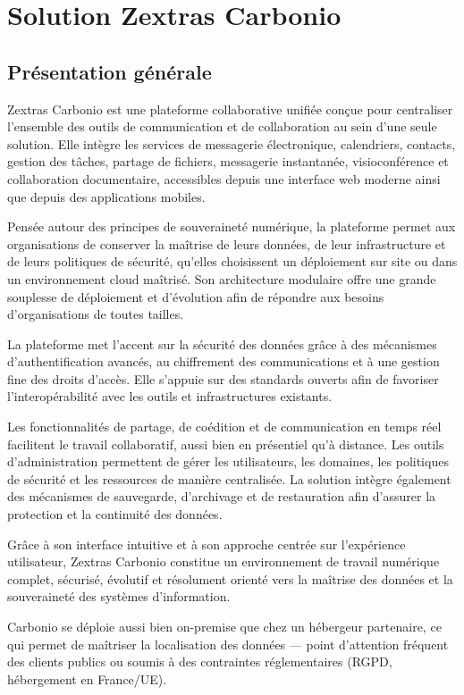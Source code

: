
\chapter{Solution Zextras Carbonio}

\section{Présentation générale}
Zextras Carbonio est une plateforme collaborative unifiée conçue pour
centraliser l'ensemble des outils de communication et de collaboration
au sein d'une seule solution. Elle intègre les services de messagerie
électronique, calendriers, contacts, gestion des tâches, partage de
fichiers, messagerie instantanée, visioconférence et collaboration
documentaire, accessibles depuis une interface web moderne ainsi que
depuis des applications mobiles.

Pensée autour des principes de souveraineté numérique, la plateforme
permet aux organisations de conserver la maîtrise de leurs données, de
leur infrastructure et de leurs politiques de sécurité, qu'elles
choisissent un déploiement sur site ou dans un environnement cloud
maîtrisé. Son architecture modulaire offre une grande souplesse de
déploiement et d'évolution afin de répondre aux besoins d'organisations
de toutes tailles.

La plateforme met l'accent sur la sécurité des données grâce à des
mécanismes d'authentification avancés, au chiffrement des
communications et à une gestion fine des droits d'accès. Elle s'appuie
sur des standards ouverts afin de favoriser l'interopérabilité avec les
outils et infrastructures existants.

Les fonctionnalités de partage, de coédition et de communication en
temps réel facilitent le travail collaboratif, aussi bien en présentiel
qu'à distance. Les outils d'administration permettent de gérer les
utilisateurs, les domaines, les politiques de sécurité et les
ressources de manière centralisée. La solution intègre également des
mécanismes de sauvegarde, d'archivage et de restauration afin d'assurer
la protection et la continuité des données.

Grâce à son interface intuitive et à son approche centrée sur
l'expérience utilisateur, Zextras Carbonio constitue un environnement
de travail numérique complet, sécurisé, évolutif et résolument orienté
vers la maîtrise des données et la souveraineté des systèmes
d'information.

Carbonio se déploie aussi bien on-premise que chez un hébergeur
partenaire, ce qui permet de maîtriser la localisation des données ---
point d'attention fréquent des clients publics ou soumis à des
contraintes réglementaires (RGPD, hébergement en France/UE).
